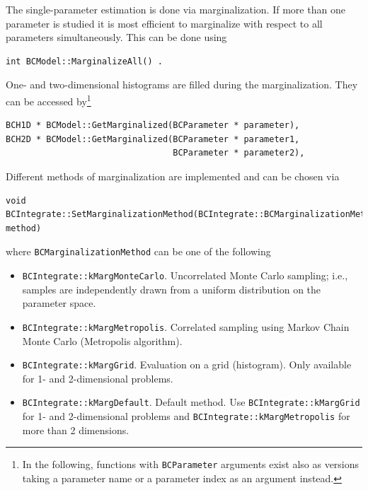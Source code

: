 \documentclass[11pt, a4paper]{article}
\newcommand{\code}[1]{\texttt{#1}}
\begin{document}
The single-parameter estimation is done via marginalization. If more
than one parameter is studied it is most efficient to marginalize with
respect to all parameters simultaneously. This can be done using
%
\begin{verbatim}
int BCModel::MarginalizeAll() .
\end{verbatim}
%
One- and two-dimensional histograms are filled during the
marginalization. They can be accessed by\footnote{In the following,
  functions with \code{BCParameter} arguments exist also as versions
  taking a parameter name or a parameter index as an argument instead.}
%
\begin{verbatim}
BCH1D * BCModel::GetMarginalized(BCParameter * parameter),
BCH2D * BCModel::GetMarginalized(BCParameter * parameter1,
                                 BCParameter * parameter2),
\end{verbatim}

%

Different methods of marginalization are implemented and can be chosen
via
%
\begin{verbatim}
void BCIntegrate::SetMarginalizationMethod(BCIntegrate::BCMarginalizationMethod method)
\end{verbatim}

where \verb|BCMarginalizationMethod| can be one of the following
%
\begin{itemize}
\item \verb|BCIntegrate::kMargMonteCarlo|. Uncorrelated Monte Carlo sampling;
  i.e., samples are independently drawn from a uniform distribution on the parameter space.
\item \verb|BCIntegrate::kMargMetropolis|. Correlated sampling using
  Markov Chain Monte Carlo (Metropolis algorithm).
\item \verb|BCIntegrate::kMargGrid|. Evaluation on a grid
  (histogram). Only available for 1- and 2-dimensional problems.
\item \verb|BCIntegrate::kMargDefault|. Default method. Use
  \verb|BCIntegrate::kMargGrid| for 1- and 2-dimensional problems and
  \verb|BCIntegrate::kMargMetropolis| for more than 2 dimensions.
\end{itemize}
\end{document}
